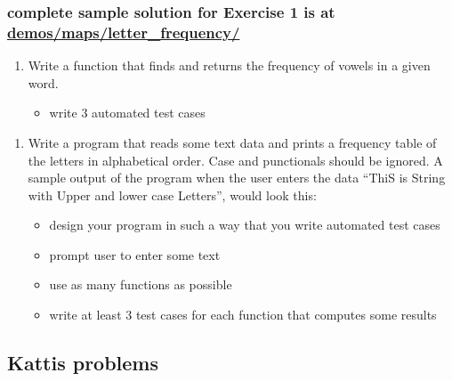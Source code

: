 \documentclass[11pt]{article}
\providecommand{\tightlist}{%
      \setlength{\itemsep}{0pt}\setlength{\parskip}{0pt}}
\begin{document}
    \hypertarget{complete-sample-solution-for-exercise-1-is-at-demosmapsletter_frequency}{%
\subsubsection{\texorpdfstring{complete sample solution for Exercise 1
is at
\url{demos/maps/letter_frequency/}}{complete sample solution for Exercise 1 is at demos/maps/letter\_frequency/}}\label{complete-sample-solution-for-exercise-1-is-at-demosmapsletter_frequency}}

\begin{enumerate}
\def\labelenumi{\arabic{enumi}.}
\setcounter{enumi}{1}
\tightlist
\item
  Write a function that finds and returns the frequency of vowels in a
  given word.

  \begin{itemize}
  \tightlist
  \item
    write 3 automated test cases
  \end{itemize}
\end{enumerate}

    \begin{enumerate}
\def\labelenumi{\arabic{enumi}.}
\setcounter{enumi}{2}
\tightlist
\item
  Write a program that reads some text data and prints a frequency table
  of the letters in alphabetical order. Case and punctionals should be
  ignored. A sample output of the program when the user enters the data
  ``ThiS is String with Upper and lower case Letters'', would look this:

  \begin{itemize}
  \tightlist
  \item
    design your program in such a way that you write automated test
    cases
  \item
    prompt user to enter some text
  \item
    use as many functions as possible
  \item
    write at least 3 test cases for each function that computes some
    results
  \end{itemize}
\end{enumerate}

    \hypertarget{kattis-problems}{%
\subsection{Kattis problems}\label{kattis-problems}}
\end{document}
